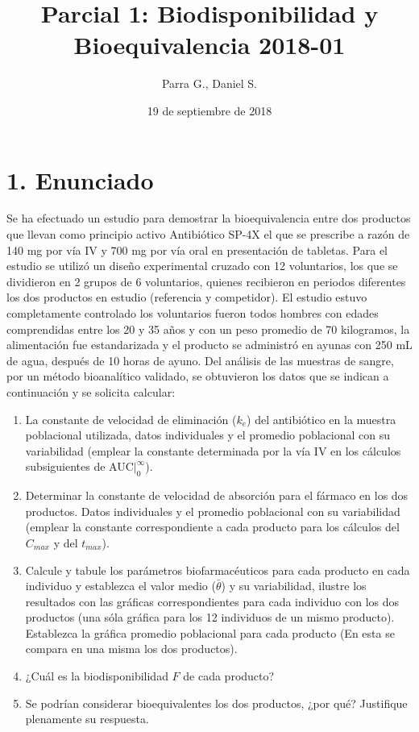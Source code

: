 \documentclass[]{article}
\title{Parcial 1: Biodisponibilidad y Bioequivalencia 2018-01}
\author{Parra G., Daniel S.}
\date{19 de septiembre de 2018}
\begin{document}
\maketitle

\section{1. Enunciado}\label{enunciado}

Se ha efectuado un estudio para demostrar la bioequivalencia entre dos
productos que llevan como principio activo Antibiótico SP-4X el que se
prescribe a razón de 140 mg por vía IV y 700 mg por vía oral en
presentación de tabletas. Para el estudio se utilizó un diseño
experimental cruzado con 12 voluntarios, los que se dividieron en 2
grupos de 6 voluntarios, quienes recibieron en periodos diferentes los
dos productos en estudio (referencia y competidor). El estudio estuvo
completamente controlado los voluntarios fueron todos hombres con edades
comprendidas entre los 20 y 35 años y con un peso promedio de 70
kilogramos, la alimentación fue estandarizada y el producto se
administró en ayunas con 250 mL de agua, después de 10 horas de ayuno.
Del análisis de las muestras de sangre, por un método bioanalítico
validado, se obtuvieron los datos que se indican a continuación y se
solicita calcular:

\begin{enumerate}
\def\labelenumi{\arabic{enumi}.}
\item
  La constante de velocidad de eliminación (\(k_{e}\)) del antibiótico
  en la muestra poblacional utilizada, datos individuales y el promedio
  poblacional con su variabilidad (emplear la constante determinada por
  la vía IV en los cálculos subsiguientes de AUC\(|_{0}^{\infty}\)).
\item
  Determinar la constante de velocidad de absorción para el fármaco en
  los dos productos. Datos individuales y el promedio poblacional con su
  variabilidad (emplear la constante correspondiente a cada producto
  para los cálculos del \(C_{max}\) y del \(t_{max}\)).
\item
  Calcule y tabule los parámetros biofarmacéuticos para cada producto en
  cada individuo y establezca el valor medio (\(\bar{\theta}\)) y su
  variabilidad, ilustre los resultados con las gráficas correspondientes
  para cada individuo con los dos productos (una sóla gráfica para los
  12 individuos de un mismo producto). Establezca la gráfica promedio
  poblacional para cada producto (En esta se compara en una misma los
  dos productos).
\item
  ¿Cuál es la biodisponibilidad \(F\) de cada producto?
\item
  Se podrían considerar bioequivalentes los dos productos, ¿por qué?
  Justifique plenamente su respuesta.
\end{enumerate}
\end{document}
